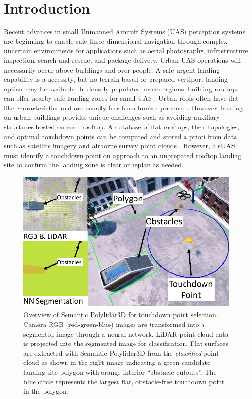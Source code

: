 \section{Introduction}

Recent advances in small Unmanned Aircraft Systems (UAS) perception systems are beginning to enable safe three-dimensional navigation through complex uncertain environments for applications such as aerial photography, infrastructure inspection, search and rescue, and package delivery. Urban UAS operations will necessarily occur above buildings and over people. A safe urgent landing capability is a necessity, but no terrain-based or prepared vertiport landing option \cite{patterson_timely_2014, atkins_emergency_2006, di_donato_evaluating_2017} may be available.  In densely-populated urban regions, building rooftops can offer nearby safe landing zones for small UAS \cite{desaraju_vision-based_2015}. Urban roofs often have flat-like characteristics and are usually free from human presence \cite{castagno_roof_2018}. However, landing on urban buildings provides unique challenges such as avoiding auxiliary structures hosted on each rooftop.  A database of flat rooftops, their topologies, and optimal touchdown points can be computed and stored a priori from data such as satellite imagery and airborne survey point clouds \cite{castagno_map-based_2021}. However, a sUAS must identify a touchdown point on approach to an unprepared rooftop landing site to confirm the landing zone is clear or replan as needed.

\begin{figure}[!ht]
    \centering
    \includegraphics[width=0.70\columnwidth]{chapter_6_landingsim/figs/main_photo.pdf}
    \caption[Overview of Semantic Polylidar3D for touchdown point selection]{Overview of Semantic Polylidar3D for touchdown point selection. Camera RGB (red-green-blue) images are transformed into a segmented image through a neural network. LiDAR point cloud data is projected into the segmented image for classification. Flat surfaces are extracted with Semantic Polylidar3D \cite{castagno_polylidar3d_2020} from the \textit{classified} point cloud as shown in the right image indicating a green candidate landing site polygon with orange interior ``obstacle cutouts''. The blue circle represents the largest flat, obstacle-free touchdown point in the polygon.}
    \label{fig:ch6_ls_overview}
\end{figure}


